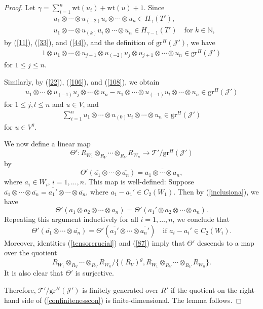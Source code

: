 \documentclass[9pt]{amsart}
\newcommand{\T}{\mathcal{T}}
\newcommand{\J}{\mathcal{J}}
\begin{document}
\begin{proof}
Let $\gamma = \sum_{i=1}^{n} \mathrm{wt}(u_i) + \mathrm{wt}(u) + 1$. Since
\begin{align*}
    & u_1 \otimes \cdots \otimes u_{(-2)}u_i \otimes \cdots \otimes u_n \in H_\gamma(T'),\\
    & u_1 \otimes \cdots \otimes u_{(k)}u_i \otimes \cdots \otimes u_n \in H_{\gamma-1}(T') \quad \text{for } k\in \mathbb{N},
\end{align*}
by (\ref{11}), (\ref{33}), and (\ref{44}), and the definition of $\mathrm{gr}^{H}(\J')$, we have
\begin{align}\label{inclusiona}
    1 \otimes u_1 \otimes \cdots \otimes u_{j-1} \otimes u_{(-2)}u_j \otimes u_{j+1} \otimes \cdots \otimes u_n \in \mathrm{gr}^{H}(\J')
\end{align}
for $1 \leq j \leq n$.

Similarly, by (\ref{22}), (\ref{106}), and (\ref{108}), we obtain
\begin{align}\label{tensorcrucial}
    u_1 \otimes \cdots \otimes u_{(-1)}u_j\otimes \cdots \otimes u_n 
    - u_1 \otimes \cdots \otimes u_{(-1)}u_l \otimes \cdots \otimes u_n 
    \in \mathrm{gr}^{H}(\J')
\end{align}
for $1 \leq j, l \leq n$ and $u \in V$, and
\begin{align}\label{87}
    \sum_{i=1}^{n} u_1 \otimes \cdots \otimes u_{(0)}u_i \otimes \cdots \otimes u_n \in \mathrm{gr}^{H}(\J')
\end{align}
for $u \in V^g$.

We now define a linear map
\[
\Theta': R_{W_1} \otimes_{R_V} \cdots \otimes_{R_V} R_{W_n} \rightarrow \T' / \mathrm{gr}^{H}(\J')
\]
by
\[
\Theta'\left( \overline{a_1} \otimes \cdots \otimes \overline{a_n} \right) = \overline{a_1 \otimes \cdots \otimes a_n},
\]
where $a_i \in W_i$, $i = 1, \dots, n$. This map is well-defined: Suppose $\overline{a_1} \otimes \cdots \otimes \overline{a_n} = \overline{a_1'} \otimes \cdots \otimes \overline{a_n}$, where $a_1 - a_1' \in C_2(W_1)$. Then by (\ref{inclusiona}), we have
\[
\Theta'(a_1 \otimes a_2 \otimes \cdots \otimes a_n) = \Theta'(a_1' \otimes a_2 \otimes \cdots \otimes a_n).
\]
Repeating this argument inductively for all $i = 1, \dots, n$, we conclude that
\[
\Theta'\left( \overline{a_1} \otimes \cdots \otimes \overline{a_n} \right) = \Theta' \left( \overline{a_1'} \otimes \cdots \otimes \overline{a_n'} \right)
\quad \text{if } a_i - a_i' \in C_2(W_i).
\]
Moreover, identities (\ref{tensorcrucial}) and (\ref{87}) imply that $\Theta'$ descends to a map over the quotient
\[
R_{W_1} \otimes_{R_V} \cdots \otimes_{R_V} R_{W_n} \big/ \{ (R_V)^g, R_{W_1} \otimes_{R_V} \cdots \otimes_{R_V} R_{W_n} \}.
\]
It is also clear that $\Theta'$ is surjective.

Therefore, $\T'/\mathrm{gr}^{H}(\J')$ is finitely generated over $R'$ if the quotient on the right-hand side of (\ref{confinitenesscon}) is finite-dimensional. The lemma follows.
\end{proof}
\end{document}
